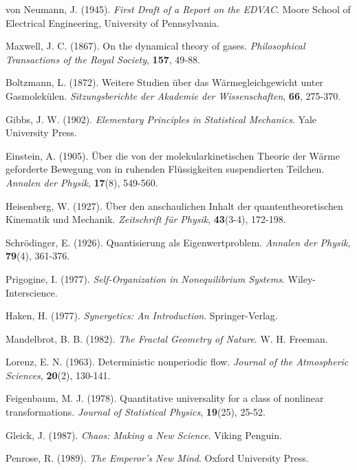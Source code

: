 \documentclass[12pt,a4paper]{article}
\begin{document}
\begin{thebibliography}{99}
von Neumann, J. (1945). \textit{First Draft of a Report on the EDVAC}. Moore School of Electrical Engineering, University of Pennsylvania.

Maxwell, J. C. (1867). On the dynamical theory of gases. \textit{Philosophical Transactions of the Royal Society}, \textbf{157}, 49-88.

Boltzmann, L. (1872). Weitere Studien über das Wärmegleichgewicht unter Gasmolekülen. \textit{Sitzungsberichte der Akademie der Wissenschaften}, \textbf{66}, 275-370.

Gibbs, J. W. (1902). \textit{Elementary Principles in Statistical Mechanics}. Yale University Press.

Einstein, A. (1905). Über die von der molekularkinetischen Theorie der Wärme geforderte Bewegung von in ruhenden Flüssigkeiten suspendierten Teilchen. \textit{Annalen der Physik}, \textbf{17}(8), 549-560.

Heisenberg, W. (1927). Über den anschaulichen Inhalt der quantentheoretischen Kinematik und Mechanik. \textit{Zeitschrift für Physik}, \textbf{43}(3-4), 172-198.

Schrödinger, E. (1926). Quantisierung als Eigenwertproblem. \textit{Annalen der Physik}, \textbf{79}(4), 361-376.

Prigogine, I. (1977). \textit{Self-Organization in Nonequilibrium Systems}. Wiley-Interscience.

Haken, H. (1977). \textit{Synergetics: An Introduction}. Springer-Verlag.

Mandelbrot, B. B. (1982). \textit{The Fractal Geometry of Nature}. W. H. Freeman.

Lorenz, E. N. (1963). Deterministic nonperiodic flow. \textit{Journal of the Atmospheric Sciences}, \textbf{20}(2), 130-141.

Feigenbaum, M. J. (1978). Quantitative universality for a class of nonlinear transformations. \textit{Journal of Statistical Physics}, \textbf{19}(25), 25-52.

Gleick, J. (1987). \textit{Chaos: Making a New Science}. Viking Penguin.

Penrose, R. (1989). \textit{The Emperor's New Mind}. Oxford University Press.


\end{thebibliography}
\end{document}
